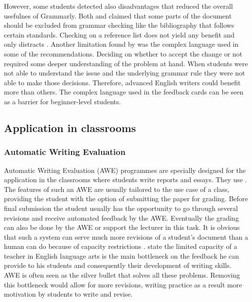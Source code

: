 \documentclass[runningheads]{llncs}
\begin{document}
However, some students detected also disadvantages that reduced the overall usefulnes of Grammarly. Both \citeauthor{ventayen_graduate_2018} and  \citeauthor{nova_utilizing_2018} claimed that some parts of the document should be excluded from grammar checking like the bibliography that follows certain standards. Checking on a reference list does not yield any benefit and only distracts \citep{ventayen_graduate_2018, nova_utilizing_2018}. Another limitation found by \textcite{cavaleri_you_2016} was the complex language used in some of the recommendations. Deciding on whether to accept the change or not required some deeper understanding of the problem at hand. When students were not able to understand the issue and the underlying grammar rule they were not able to make those decisions. Therefore, advanced English writers could benefit more than others. The complex language used in the feedback cards can be seen as a barrier for beginner-level students. 

\subsection{Application in classrooms}
\subsubsection{Automatic Writing Evaluation}
Automatic Writing Evaluation (AWE) programmes are specially designed for the application in the classrooms where students write reports and essays. They use  .
The features of such an AWE are usually tailored to the use case of a class, providing the student with the option of submitting the paper for grading. Before final submission the student usually has the opportunity to go through several revisions and receive automated feedback by the AWE. Eventually the grading can also be done by the AWE or support the lecturer in this task. It is obvious that such a system can serve much more revisions of a student's document than a human can do because of capacity restrictions \citep{warschauer_automated_2006}. \textcite{grimes_utility_2010} state the limited capacity of a teacher in English language arts is the main bottleneck on the feedback he can provide to his students and consequently their development of writing skills. AWE is often seen as the silver bullet that solves all these problems. Removing this bottleneck would allow for more revisions, writing practice as a result more motivation by students to write and revise.
\end{document}

